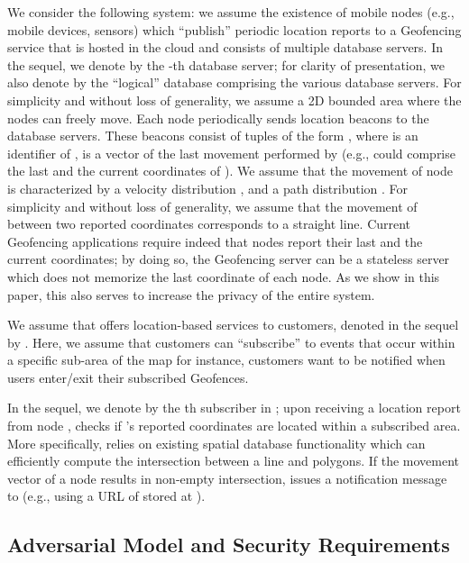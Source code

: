 \documentclass{llncs}
\begin{document}
We consider the following system: we assume the existence of mobile nodes  (e.g., mobile devices, sensors) which ``publish'' periodic location reports to a Geofencing service that is hosted in the cloud and consists of multiple database servers.
In the sequel, we denote by  the -th database server; for clarity of presentation, we also denote by  the ``logical'' database comprising the various database servers. For simplicity and without loss of generality, we assume a 2D bounded area where the nodes can freely move. Each node  periodically sends location beacons to the database servers. These beacons consist of tuples of the form , where  is an identifier of ,
 is a vector of the last movement performed by  (e.g.,  could comprise the last and the current coordinates of ). We assume that the movement of node  is characterized
by a velocity distribution , and a path distribution . For simplicity and without loss of generality, we assume that the movement of  between two reported coordinates
corresponds to a straight line. Current Geofencing applications require indeed that nodes report their last and the current coordinates; by doing so, the Geofencing server can
be a stateless server which does not memorize
the last coordinate of each node. As we show in this paper, this also serves to increase the privacy of the entire system.

We assume that  offers location-based services to customers, denoted in the sequel by . Here, we assume that customers can ``subscribe'' to events that
occur within a specific sub-area of the map for instance, customers want to be notified when users enter/exit their subscribed Geofences.

In the sequel, we denote by  the th subscriber in ; upon receiving a location report from node ,  checks if
's reported coordinates are located within a subscribed area. More specifically,  relies on existing spatial database functionality which can efficiently compute the intersection between a line and polygons.
If the movement vector of a node results in non-empty intersection,  issues a notification message to  (e.g., using a URL of  stored at ).





\subsection{Adversarial Model and Security Requirements}\label{subsec:attack}
\end{document}
